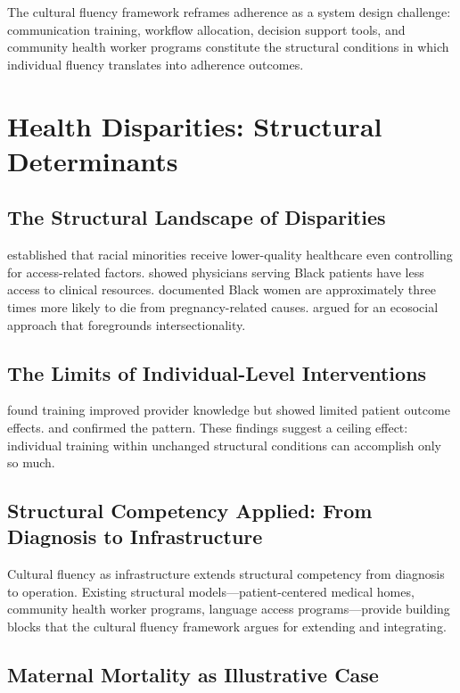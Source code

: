 \documentclass[12pt, a4paper]{article}
\begin{document}
The cultural fluency framework reframes adherence as a system design challenge: communication training, workflow allocation, decision support tools, and community health worker programs constitute the structural conditions in which individual fluency translates into adherence outcomes.

\section{Health Disparities: Structural Determinants}

\subsection{The Structural Landscape of Disparities}

\citet{smedley2003} established that racial minorities receive lower-quality healthcare even controlling for access-related factors. \citet{bach2004} showed physicians serving Black patients have less access to clinical resources. \citet{petersen2019} documented Black women are approximately three times more likely to die from pregnancy-related causes. \citet{krieger2012} argued for an ecosocial approach that foregrounds intersectionality.

\subsection{The Limits of Individual-Level Interventions}

\citet{beach2005} found training improved provider knowledge but showed limited patient outcome effects. \citet{lie2011} and \citet{truong2014} confirmed the pattern. These findings suggest a ceiling effect: individual training within unchanged structural conditions can accomplish only so much.

\subsection{Structural Competency Applied: From Diagnosis to Infrastructure}

Cultural fluency as infrastructure extends structural competency from diagnosis to operation. Existing structural models---patient-centered medical homes, community health worker programs, language access programs---provide building blocks that the cultural fluency framework argues for extending and integrating.

\subsection{Maternal Mortality as Illustrative Case}
\end{document}

